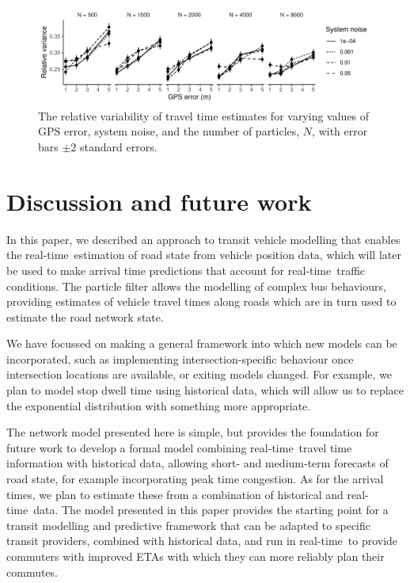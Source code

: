\documentclass[times, doublespace]{anzsauth}
\newcommand{\rt}{real-time\ }
\begin{document}
\begin{figure}[tb]
    \centering
    \includegraphics[width=\textwidth]{figures/04_model_results_times.pdf}
    \caption{
        The relative variability of travel time estimates for varying
        values of GPS error, system noise, and the number of particles, $N$,
        with error bars $\pm 2$ standard errors.
    }
    \label{fig:travel_times}
\end{figure}


\section{Discussion and future work}
\label{sec:discussion}

In this paper, we described an approach to transit vehicle modelling
that enables the \rt estimation of road state from vehicle position data,
which will later be used to make arrival time predictions
that account for \rt traffic conditions.
The particle filter allows the modelling of complex bus behaviours,
providing estimates of vehicle travel times along roads
which are in turn used to estimate the road network state.


We have focussed on making a general framework
into which new models can be incorporated,
such as implementing intersection-specific behaviour
once intersection locations are available,
or exiting models changed.
For example, we plan to model stop dwell time using historical data,
which will allow us to replace the exponential distribution
with something more appropriate.


The network model presented here is simple,
but provides the foundation for future work to
develop a formal model combining \rt travel time information with historical data,
allowing short- and medium-term forecasts of road state,
for example incorporating peak time congestion.
As for the arrival times,
we plan to estimate these from a combination of historical
and \rt data.
The model presented in this paper provides the starting point
for a transit modelling and predictive framework
that can be adapted to specific transit providers,
combined with historical data,
and run in \rt to provide commuters with
improved ETAs with which they can more reliably
plan their commutes.
\end{document}
